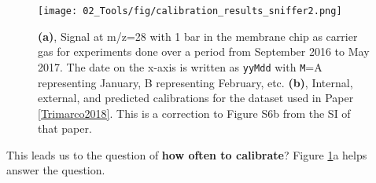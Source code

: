 \begin{figure}[h!]
	\texttt{[image: 02\_Tools/fig/calibration\_results\_sniffer2.png]}
	\caption{\textbf{(a)}, Signal at m/z=28 with 1 bar  in the membrane chip as carrier gas for experiments done over a period from September 2016 to May 2017. The date on the x-axis is written as \texttt{yyMdd} with \texttt{M}=A representing January, B representing February, etc. \textbf{(b)}, Internal, external, and predicted calibrations for the dataset used in Paper \ref{Trimarco2018}. This is a correction to Figure S6b from the SI of that paper.}
	\label{fig:CuNPs}
\end{figure}

This leads us to the question of \textbf{how often to calibrate}? Figure \ref{fig:CuNPs}a helps answer the question.

